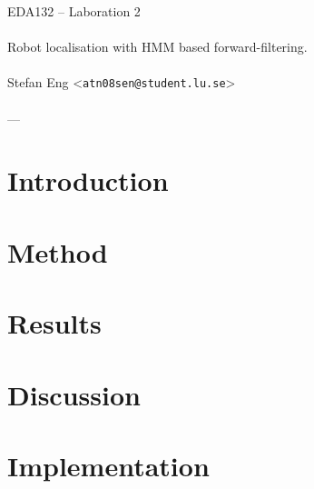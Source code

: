 \documentclass{article}
\begin{document}
  \begin{center}
    EDA132 -- Laboration 2\\
    \ \\
    {\Large Robot localisation with HMM based forward-filtering.} \\
    \ \\
    Stefan Eng <\texttt{atn08sen@student.lu.se}> \\
    \ \\
    ---
  \end{center}
  \vspace{-0.8cm}
  \section*{Introduction}
  \section*{Method}
  \section*{Results}
  \section*{Discussion}
  \section*{Implementation}
\end{document}
